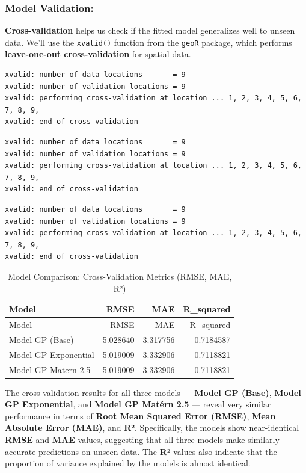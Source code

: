 \documentclass[
  11pt,
]{article}
\begin{document}
\subsubsection{Model Validation:}\label{model-validation-1}

\textbf{Cross-validation} helps us check if the fitted model generalizes
well to unseen data. We'll use the \texttt{xvalid()} function from the
\texttt{geoR} package, which performs \textbf{leave-one-out
cross-validation} for spatial data.

\begin{verbatim}
xvalid: number of data locations       = 9
xvalid: number of validation locations = 9
xvalid: performing cross-validation at location ... 1, 2, 3, 4, 5, 6, 7, 8, 9, 
xvalid: end of cross-validation
\end{verbatim}

\begin{verbatim}
xvalid: number of data locations       = 9
xvalid: number of validation locations = 9
xvalid: performing cross-validation at location ... 1, 2, 3, 4, 5, 6, 7, 8, 9, 
xvalid: end of cross-validation
\end{verbatim}

\begin{verbatim}
xvalid: number of data locations       = 9
xvalid: number of validation locations = 9
xvalid: performing cross-validation at location ... 1, 2, 3, 4, 5, 6, 7, 8, 9, 
xvalid: end of cross-validation
\end{verbatim}

\begin{longtable}[]{@{}lrrr@{}}
\caption{Model Comparison: Cross-Validation Metrics (RMSE, MAE,
R²)}\tabularnewline
\toprule\noalign{}
Model & RMSE & MAE & R\_squared \\
\midrule\noalign{}
\endfirsthead
\toprule\noalign{}
Model & RMSE & MAE & R\_squared \\
\midrule\noalign{}
\endhead
\bottomrule\noalign{}
\endlastfoot
Model GP (Base) & 5.028640 & 3.317756 & -0.7184587 \\
Model GP Exponential & 5.019009 & 3.332906 & -0.7118821 \\
Model GP Matern 2.5 & 5.019009 & 3.332906 & -0.7118821 \\
\end{longtable}

The cross-validation results for all three models --- \textbf{Model GP
(Base)}, \textbf{Model GP Exponential}, and \textbf{Model GP Matérn 2.5}
--- reveal very similar performance in terms of \textbf{Root Mean
Squared Error (RMSE)}, \textbf{Mean Absolute Error (MAE)}, and
\textbf{R²}. Specifically, the models show near-identical \textbf{RMSE}
and \textbf{MAE} values, suggesting that all three models make similarly
accurate predictions on unseen data. The \textbf{R²} values also
indicate that the proportion of variance explained by the models is
almost identical.
\end{document}
